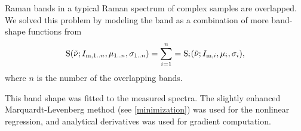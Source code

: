Raman bands in a typical Raman spectrum of complex samples are overlapped.
We solved this problem by modeling the band as a combination of more
band-shape functions from
\begin{equation}
	\func{S}(\wn; I_{\text{m},1..n}, \mu_{1..n}, \sigma_{1..n}) =
		\sum_{i = 1}^n = 	\func{S}_i(\wn; I_{\text{m},i}, \mu_i, \sigma_i),
	\label{\eqnlabel{band_intensities:shape}}
\end{equation}
where $n$ is the number of the overlapping bands.

This band shape was fitted to the measured spectra. The slightly enhanced
Marquardt-Levenberg method
(see \cref{minimization})
was used for the nonlinear regression, and analytical derivatives was used for
gradient computation.
\\
